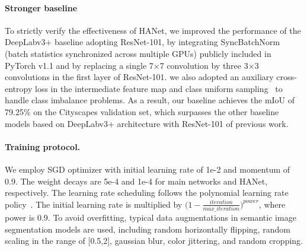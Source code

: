 \documentclass[10pt,twocolumn,letterpaper]{article}
\begin{document}
\vspace*{-0.5cm}
\paragraph{Stronger baseline}
To strictly verify the effectiveness of HANet, we improved the performance of the DeepLabv3+ baseline adopting ResNet-101, by integrating SyncBatchNorm (batch statistics synchronized across multiple GPUs) publicly included in PyTorch v1.1 and by replacing a single 7$\times$7 convolution by three 3$\times$3 convolutions in the first layer of ResNet-101. we also adopted an auxiliary cross-entropy loss in the intermediate feature map and class uniform sampling~\cite{rota2018place, zhu2019improving} to handle class imbalance problems. As a result, our baseline achieves the mIoU of 79.25\% on the Cityscapes validation set, which surpasses the other baseline models based on DeepLabv3+ architecture with ResNet-101 of previous work.


\vspace*{-0.5cm}
\paragraph{Training protocol.}
We employ SGD optimizer with initial learning rate of 1e-2 and momentum of 0.9. The weight decays are 5e-4 and 1e-4 for main networks and HANet, respectively. The learning rate scheduling follows the polynomial learning rate policy~\cite{liu2015parsenet}. The initial learning rate is multiplied by $\big(1-\frac{iteration}{max\_ iteration}\big)^{power}$, where power is 0.9. To avoid overfitting, typical data augmentations in semantic image segmentation models are used, including random horizontally flipping, random scaling in the range of [0.5,2], gaussian blur, color jittering, and random cropping.
\end{document}
